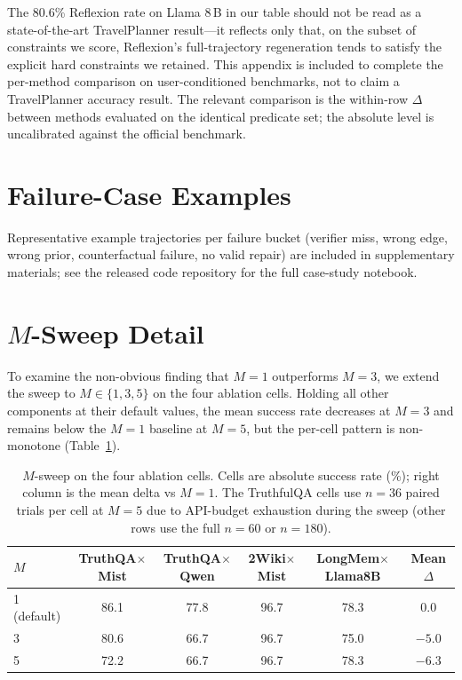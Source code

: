\documentclass{article}
\begin{document}
The 80.6\% Reflexion rate on Llama 8\,B in our table should not be read as a state-of-the-art TravelPlanner result---it reflects only that, on the subset of constraints we score, Reflexion's full-trajectory regeneration tends to satisfy the explicit hard constraints we retained. This appendix is included to complete the per-method comparison on user-conditioned benchmarks, not to claim a TravelPlanner accuracy result. The relevant comparison is the within-row $\Delta$ between methods evaluated on the identical predicate set; the absolute level is uncalibrated against the official benchmark.

\section{Failure-Case Examples}\label{app:failure-cases}
Representative example trajectories per failure bucket (verifier miss, wrong edge, wrong prior, counterfactual failure, no valid repair) are included in supplementary materials; see the released code repository for the full case-study notebook.

\section{$M$-Sweep Detail}\label{app:m-sweep}
To examine the non-obvious finding that $M{=}1$ outperforms $M{=}3$, we extend the sweep to $M \in \{1, 3, 5\}$ on the four ablation cells. Holding all other components at their default values, the mean success rate decreases at $M{=}3$ and remains below the $M{=}1$ baseline at $M{=}5$, but the per-cell pattern is non-monotone (Table~\ref{tab:m-sweep}).

\begin{table}[h]\centering\small
\caption{$M$-sweep on the four ablation cells. Cells are absolute success rate (\%); right column is the mean delta vs $M{=}1$. The TruthfulQA cells use $n{=}36$ paired trials per cell at $M{=}5$ due to API-budget exhaustion during the sweep (other rows use the full $n{=}60$ or $n{=}180$).}
\label{tab:m-sweep}\setlength{\tabcolsep}{4pt}
\begin{tabular}{lccccc}\toprule
$M$ & TruthQA$\times$Mist & TruthQA$\times$Qwen & 2Wiki$\times$Mist & LongMem$\times$Llama8B & Mean $\Delta$ \\\midrule
1 (default) & 86.1 & 77.8 & 96.7 & 78.3 & 0.0 \\
3           & 80.6 & 66.7 & 96.7 & 75.0 & $-5.0$ \\
5           & 72.2 & 66.7 & 96.7 & 78.3 & $-6.3$ \\
\bottomrule\end{tabular}\end{table}
\end{document}
